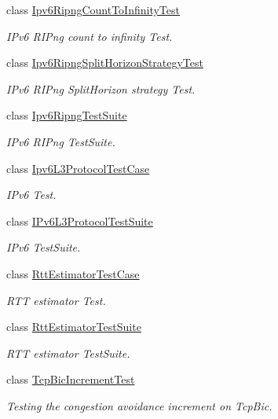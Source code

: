 \begin{DoxyCompactItemize}
class \hyperlink{classIpv6RipngCountToInfinityTest}{Ipv6\+Ripng\+Count\+To\+Infinity\+Test}
\begin{DoxyCompactList}\small\item\em I\+Pv6 R\+I\+Png count to infinity Test. \end{DoxyCompactList}\item 
class \hyperlink{classIpv6RipngSplitHorizonStrategyTest}{Ipv6\+Ripng\+Split\+Horizon\+Strategy\+Test}
\begin{DoxyCompactList}\small\item\em I\+Pv6 R\+I\+Png Split\+Horizon strategy Test. \end{DoxyCompactList}\item 
class \hyperlink{classIpv6RipngTestSuite}{Ipv6\+Ripng\+Test\+Suite}
\begin{DoxyCompactList}\small\item\em I\+Pv6 R\+I\+Png Test\+Suite. \end{DoxyCompactList}\item 
class \hyperlink{classIpv6L3ProtocolTestCase}{Ipv6\+L3\+Protocol\+Test\+Case}
\begin{DoxyCompactList}\small\item\em I\+Pv6 Test. \end{DoxyCompactList}\item 
class \hyperlink{classIPv6L3ProtocolTestSuite}{I\+Pv6\+L3\+Protocol\+Test\+Suite}
\begin{DoxyCompactList}\small\item\em I\+Pv6 Test\+Suite. \end{DoxyCompactList}\item 
class \hyperlink{classRttEstimatorTestCase}{Rtt\+Estimator\+Test\+Case}
\begin{DoxyCompactList}\small\item\em R\+TT estimator Test. \end{DoxyCompactList}\item 
class \hyperlink{classRttEstimatorTestSuite}{Rtt\+Estimator\+Test\+Suite}
\begin{DoxyCompactList}\small\item\em R\+TT estimator Test\+Suite. \end{DoxyCompactList}\item 
class \hyperlink{classTcpBicIncrementTest}{Tcp\+Bic\+Increment\+Test}
\begin{DoxyCompactList}\small\item\em Testing the congestion avoidance increment on Tcp\+Bic. \end{DoxyCompactList}\item 

\end{DoxyCompactItemize}
